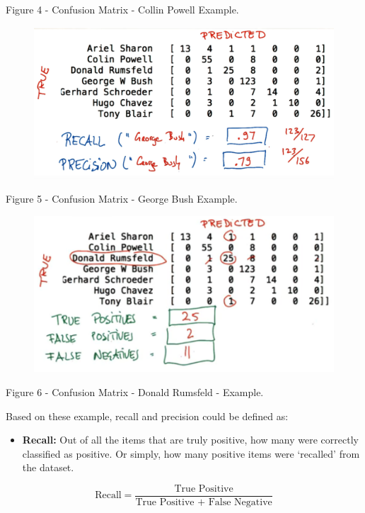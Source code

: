 \documentclass[]{book}
\providecommand{\tightlist}{%
  \setlength{\itemsep}{0pt}\setlength{\parskip}{0pt}}
\begin{document}
Figure 4 - Confusion Matrix - Collin Powell Example.

\begin{figure}
\centering
\includegraphics{01-img/c4_l16_05.png}
\caption{}
\end{figure}

Figure 5 - Confusion Matrix - George Bush Example.

\begin{figure}
\centering
\includegraphics{01-img/c4_l16_06.png}
\caption{}
\end{figure}

Figure 6 - Confusion Matrix - Donald Rumsfeld - Example.

Based on these example, recall and precision could be defined as:

\begin{itemize}
\tightlist
\item
  \textbf{Recall:} Out of all the items that are truly positive, how
  many were correctly classified as positive. Or simply, how many
  positive items were `recalled' from the dataset.
\end{itemize}

\[\text{Recall} = \frac{\text{True Positive}}{\text{True Positive + False Negative}}\]
\end{document}
